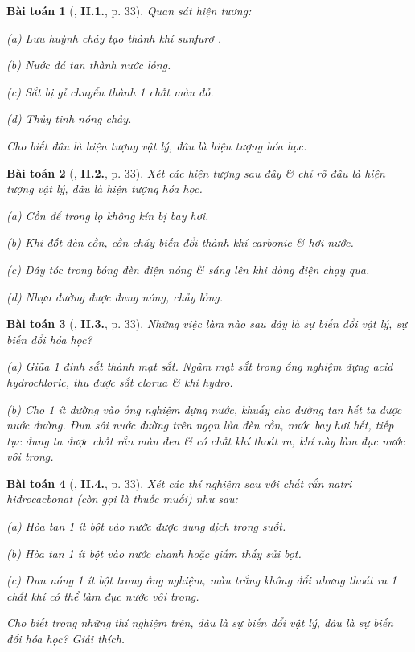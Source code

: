 \documentclass{article}
\numberwithin{equation}{section}
\newtheorem{baitoan}{Bài toán}
\begin{document}
\begin{baitoan}[\cite{Truong2021}, \textbf{II.1.}, p. 33]
	Quan sát hiện tương:
	\begin{enumerate*}
		\item[(a)] Lưu huỳnh cháy tạo thành khí sunfurơ \emph{}.
		\item[(b)] Nước đá tan thành nước lỏng.
		\item[(c)] Sắt bị gỉ chuyển thành 1 chất màu đỏ.
		\item[(d)] Thủy tinh nóng chảy.
	\end{enumerate*}
	Cho biết đâu là hiện tượng vật lý, đâu là hiện tượng hóa học.
\end{baitoan}

\begin{baitoan}[\cite{Truong2021}, \textbf{II.2.}, p. 33]
	Xét các hiện tượng sau đây \& chỉ rõ đâu là hiện tượng vật lý, đâu là hiện tượng hóa học.
	\begin{enumerate*}
		\item[(a)] Cồn để trong lọ không kín bị bay hơi.
		\item[(b)] Khi đốt đèn cồn, cồn cháy biến đổi thành khí carbonic \& hơi nước.
		\item[(c)] Dây tóc trong bóng đèn điện nóng \& sáng lên khi dòng điện chạy qua.
		\item[(d)] Nhựa đường được đung nóng, chảy lỏng.
	\end{enumerate*}
\end{baitoan}

\begin{baitoan}[\cite{Truong2021}, \textbf{II.3.}, p. 33]
	Những việc làm nào sau đây là sự biến đổi vật lý, sự biến đổi hóa học?
	\begin{enumerate*}
		\item[(a)] Giũa 1 đinh sắt thành mạt sắt. Ngâm mạt sắt trong ống nghiệm đựng acid hydrochloric, thu được sắt clorua \& khí hydro.
		\item[(b)] Cho 1 ít đường vào ống nghiệm đựng nước, khuấy cho đường tan hết ta được nước đường. Đun sôi nước đường trên ngọn lửa đèn cồn, nước bay hơi hết, tiếp tục đung ta được chất rắn màu đen \& có chất khí thoát ra, khí này làm đục nước vôi trong.
	\end{enumerate*}
\end{baitoan}

\begin{baitoan}[\cite{Truong2021}, \textbf{II.4.}, p. 33]
	Xét các thí nghiệm sau với chất rắn natri hiđrocacbonat \emph{} (còn gọi là \emph{thuốc muối}) như sau:
	\begin{enumerate*}
		\item[(a)] Hòa tan 1 ít bột \emph{} vào nước được dung dịch trong suốt.
		\item[(b)] Hòa tan 1 ít bột \emph{} vào nước chanh hoặc giấm thấy sủi bọt.
		\item[(c)] Đun nóng 1 ít bột \emph{} trong ống nghiệm, màu trắng không đổi nhưng thoát ra 1 chất khí có thể làm đục nước vôi trong.
	\end{enumerate*}
	Cho biết trong những thí nghiệm trên, đâu là sự biến đổi vật lý, đâu là sự biến đổi hóa học? Giải thích.
\end{baitoan}
\end{document}
